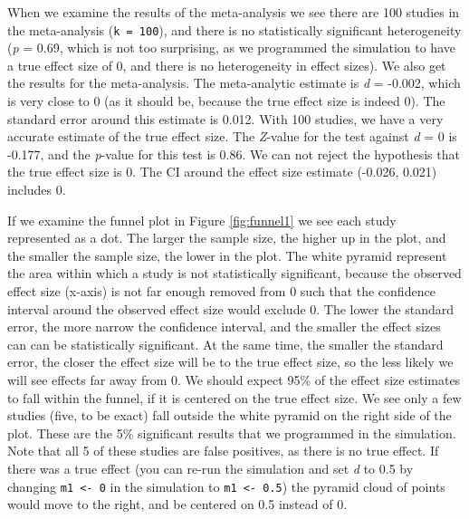 \documentclass[
  oneside]{book}
\begin{document}
When we examine the results of the meta-analysis we see there are 100 studies in the meta-analysis (\texttt{k\ =\ 100}), and there is no statistically significant heterogeneity (\emph{p} = 0.69, which is not too surprising, as we programmed the simulation to have a true effect size of 0, and there is no heterogeneity in effect sizes). We also get the results for the meta-analysis. The meta-analytic estimate is \emph{d} = -0.002, which is very close to 0 (as it should be, because the true effect size is indeed 0). The standard error around this estimate is 0.012. With 100 studies, we have a very accurate estimate of the true effect size. The \emph{Z}-value for the test against \emph{d} = 0 is -0.177, and the \emph{p}-value for this test is 0.86. We can not reject the hypothesis that the true effect size is 0. The CI around the effect size estimate (-0.026, 0.021) includes 0.

If we examine the funnel plot in Figure \ref{fig:funnel1} we see each study represented as a dot. The larger the sample size, the higher up in the plot, and the smaller the sample size, the lower in the plot. The white pyramid represent the area within which a study is not statistically significant, because the observed effect size (x-axis) is not far enough removed from 0 such that the confidence interval around the observed effect size would exclude 0. The lower the standard error, the more narrow the confidence interval, and the smaller the effect sizes can can be statistically significant. At the same time, the smaller the standard error, the closer the effect size will be to the true effect size, so the less likely we will see effects far away from 0. We should expect 95\% of the effect size estimates to fall within the funnel, if it is centered on the true effect size. We see only a few studies (five, to be exact) fall outside the white pyramid on the right side of the plot. These are the 5\% significant results that we programmed in the simulation. Note that all 5 of these studies are false positives, as there is no true effect. If there was a true effect (you can re-run the simulation and set \emph{d} to 0.5 by changing \texttt{m1\ \textless{}-\ 0} in the simulation to \texttt{m1\ \textless{}-\ 0.5}) the pyramid cloud of points would move to the right, and be centered on 0.5 instead of 0.
\end{document}

